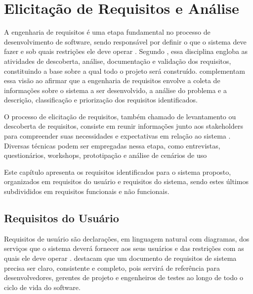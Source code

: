\chapter{Elicitação de Requisitos e Análise}
\label{cap:05}
A engenharia de requisitos é uma etapa fundamental no processo de desenvolvimento de software, sendo responsável por definir o que o sistema deve fazer 
e sob quais restrições ele deve operar \cite{Valente2020}. 
Segundo \cite{Sommerville2011}, essa disciplina engloba as atividades de descoberta, análise, documentação e validação dos requisitos, constituindo a base 
sobre a qual todo o projeto será construído.
\cite{pressman2016} complementam essa visão ao afirmar que a engenharia de requisitos envolve a coleta de informações sobre o sistema a ser desenvolvido, 
a análise do problema e a descrição, classificação e priorização dos requisitos identificados.

O processo de elicitação de requisitos, também chamado de levantamento ou descoberta de requisitos, consiste em reunir informações junto aos stakeholders 
para compreender suas necessidades e expectativas em relação ao sistema \cite{Sommerville2011}.
Diversas técnicas podem ser empregadas nessa etapa, como entrevistas, questionários, workshops, prototipação e análise de cenários de uso \cite{Valente2020}

Este capítulo apresenta os requisitos identificados para o sistema proposto, organizados em requisitos do usuário e requisitos do sistema, sendo estes últimos subdivididos em requisitos funcionais e não funcionais.


\section{Requisitos do Usuário}

Requisitos de usuário são declarações, em linguagem natural com diagramas, dos serviços que o sistema deverá fornecer aos seus usuários e das restrições 
com as quais ele deve operar \cite{Sommerville2011}.  destacam que um documento de requisitos de sistema precisa ser claro, 
consistente e completo, pois servirá de referência para desenvolvedores, gerentes de projeto e engenheiros de testes ao longo de todo o ciclo de vida do software.

